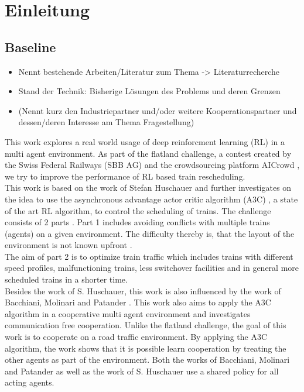 \chapter{Einleitung}\label{chap.einleitung}
\section{Baseline}\label{baseline}
\begin{itemize}
\item Nennt bestehende Arbeiten/Literatur zum Thema -> Literaturrecherche
\item Stand der Technik: Bisherige Lösungen des Problems und deren Grenzen
\item (Nennt kurz den Industriepartner und/oder weitere Kooperationspartner und dessen/deren Interesse am Thema Fragestellung)
\end{itemize}
This work explores a real world usage of deep reinforcment learning (RL) in a multi agent environment. As part of the flatland challenge, a contest created by the Swiss Federal Railways (SBB AG) and the crowdsourcing platform AICrowd \cite{aicrowd}, we try to improve the performance of RL based train rescheduling.\\
This work is based on the work of Stefan Huschauer \cite{flatlandstephan} and further investigates on the idea to use the asynchronous advantage actor critic algorithm (A3C) \cite{a3c}, a state of the art RL algorithm, to control the scheduling of trains.
The challenge consists of 2 parts \cite{aicrowd}.  
Part 1 includes avoiding conflicts with multiple trains (agents) on a given environment. The difficulty thereby is, that the layout of the environment is not known upfront .\\
The aim of part 2 is to optimize train traffic which includes trains with different speed profiles, malfunctioning trains, less switchover facilities and in general more scheduled trains in a shorter time.\\
Besides the work of S. Huschauer, this work is also influenced by the work of Bacchiani, Molinari and Patander \cite{marltraffica3c}. This work also aims to apply the A3C algorithm in a cooperative multi agent environment and investigates communication free cooperation.
Unlike the flatland challenge, the goal of this work is to cooperate on a road traffic environment. By applying the A3C algorithm, the work shows that it is possible learn cooperation by treating the other agents as part of the environment. Both the works of Bacchiani, Molinari and Patander as well as the work of S. Huschauer use a shared policy for all acting agents.

